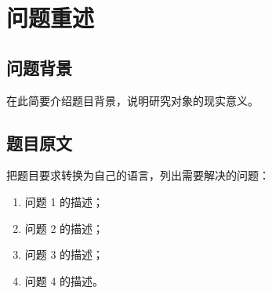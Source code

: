 \section{问题重述}

\subsection{问题背景}
在此简要介绍题目背景，说明研究对象的现实意义。

\subsection{题目原文}
把题目要求转换为自己的语言，列出需要解决的问题：

\begin{enumerate}
  \item 问题 1 的描述；
  \item 问题 2 的描述；
  \item 问题 3 的描述；
  \item 问题 4 的描述。
\end{enumerate}
